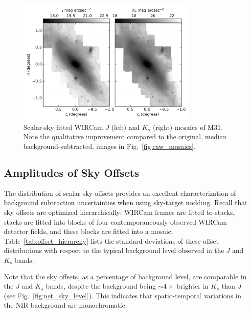 \documentclass[iop]{emulateapj}
\newcommand{\Fig}[1]{Fig.~\ref{fig:#1}}  %
\newcommand{\Tab}[1]{Table~\ref{tab:#1}}  %
\begin{document}
\begin{figure}[t]
	\centering
		\includegraphics[width=3.5in]{figs/scalar_mosaics}
	\caption{Scalar-sky fitted WIRCam $J$ (left) and $K_s$ (right) mosaics of M31. Note the qualitative improvement compared to the original, median background-subtracted, images in \Fig{raw_mosaics}.}
	\label{fig:scalar_mosaics}
\end{figure}

\subsection{Amplitudes of Sky Offsets}
\label{sec:offset_amplitudes}

The distribution of scalar sky offsets provides an excellent characterization of background subtraction uncertainties when using sky-target nodding.
Recall that sky offsets are optimized hierarchically: WIRCam frames are fitted to stacks, stacks are fitted into blocks of four contemporaneously-observed WIRCam detector fields, and these blocks are fitted into a mosaic.
\Tab{offset_hierarchy} lists the standard deviations of these offset distributions with respect to the typical background level observed in the $J$ and $K_s$ bands.


Note that the sky offsets, as a percentage of background level, are comparable in the $J$ and $K_s$ bands, despite the background being $\sim 4\times$ brighter in $K_s$ than $J$ (see \Fig{net_sky_level}).
This indicates that spatio-temporal variations in the NIR background are monochromatic.
\end{document}
